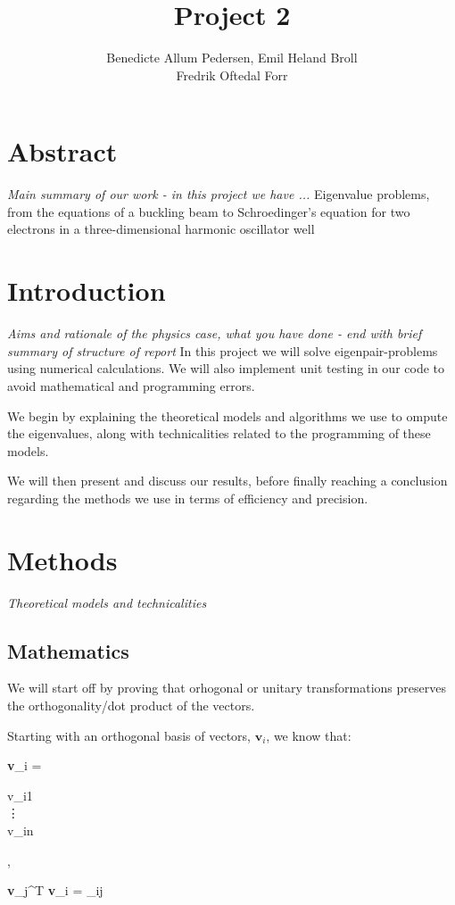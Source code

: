 \documentclass{article}
\title{Project 2}\vspace{-3ex}
\author{Benedicte Allum Pedersen, Emil Heland Broll\\ Fredrik Oftedal Forr}
\date{\vspace{-5ex}}
\begin{document}
\maketitle

\section{Abstract}
	\textit{Main summary of our work - in this project we have ...}
	Eigenvalue problems, from the equations of a buckling beam to Schroedinger's equation
	for two electrons in a three-dimensional harmonic oscillator well

\section{Introduction}
	\textit{Aims and rationale of the physics case, what you have done - end with brief
	summary of structure of report}
	In this project we will solve eigenpair-problems using numerical calculations.
	We will also implement unit testing in our code to avoid mathematical and programming errors.

	We begin by explaining the theoretical models and algorithms we use to ompute the eigenvalues,
	along with technicalities related to the programming of these models.

	We will then present and discuss our results, before finally reaching a conclusion
	regarding the methods we use in terms of efficiency and precision.

\section{Methods}
	\textit{Theoretical models and technicalities}
	\subsection{Mathematics}
		We will start off by proving that orhogonal or unitary transformations preserves
		the orthogonality/dot product of the vectors.

		Starting with an orthogonal basis of vectors, $\textbf{v}_i$, we know that:

		\begin{flalign*}
		\begin{aligned}
			\textbf{v}_i = \begin{bmatrix}
			v_{i1} \\
			\vdots \\
			v_{in}
			\end{bmatrix},
		\end{aligned}
		\qquad
		\begin{aligned}
			\textbf{v}_j^T \textbf{v}_i = \delta_{ij}
		\end{aligned}
		\end{flalign*}
\end{document}
